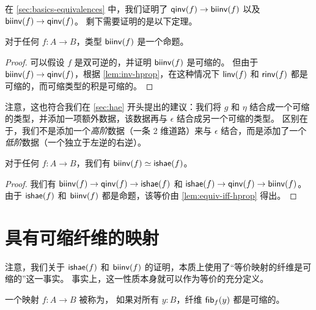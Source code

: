 在 \cref{sec:basics-equivalences} 中，我们证明了 $\mathsf{qinv}(f)\to\mathsf{biinv}(f)$ 以及 $\mathsf{biinv}(f)\to\mathsf{qinv}(f)$。
剩下需要证明的是以下定理。

\begin{thm}\label{thm:isprop-biinv}
  对于任何 $f:A\to B$，类型 $\mathsf{biinv}(f)$ 是一个命题。
\end{thm}

\begin{proof}
  可以假设 $f$ 是双可逆的，并证明 $\mathsf{biinv}(f)$ 是可缩的。
  但由于 $\mathsf{biinv}(f)\to\mathsf{qinv}(f)$，根据 \cref{lem:inv-hprop}，在这种情况下 $\mathsf{linv}(f)$ 和 $\mathsf{rinv}(f)$ 都是可缩的，而可缩类型的积是可缩的。
\end{proof}

注意，这也符合我们在 \cref{sec:hae} 开头提出的建议：我们将 $g$ 和 $\eta$ 结合成一个可缩的类型，并添加一项额外数据，该数据再与 $\epsilon$ 结合成另一个可缩的类型。
区别在于，我们不是添加一个\emph{高阶}数据（一条 2 维道路）来与 $\epsilon$ 结合，而是添加了一个\emph{低阶}数据（一个独立于左逆的右逆）。

\begin{cor}\label{thm:equiv-biinv-isequiv}
  对于任何 $f:A\to B$，我们有 $\mathsf{biinv}(f) \simeq \mathsf{ishae}(f)$。
\end{cor}

\begin{proof}
  我们有 $\mathsf{biinv}(f) \to \mathsf{qinv}(f) \to \mathsf{ishae}(f)$ 和 $\mathsf{ishae}(f) \to \mathsf{qinv}(f) \to \mathsf{biinv}(f)$。
  由于 $\mathsf{ishae}(f)$ 和 $\mathsf{biinv}(f)$ 都是命题，该等价由 \cref{lem:equiv-iff-hprop} 得出。
\end{proof}

%
%
%

\section{具有可缩纤维的映射}
\label{sec:contrf}

%
%
%

注意，我们关于 $\mathsf{ishae}(f)$ 和 $\mathsf{biinv}(f)$ 的证明，本质上使用了``等价映射的纤维是可缩的''这一事实。
事实上，这一性质本身就可以作为等价的充分定义。

\begin{defn}[可缩映射] \label{defn:equivalence}
  一个映射 $f:A\to B$ 被称为，
  如果对所有 $y:B$，纤维 ${\mathsf{fib}}_{f}(y)$ 都是可缩的。
\end{defn}

